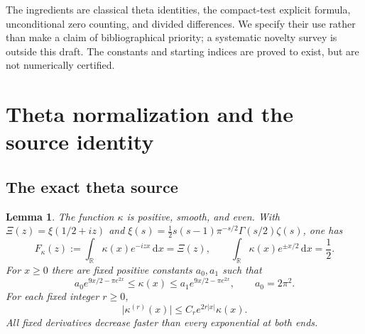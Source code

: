 \documentclass[11pt,a4paper]{article}
\newcommand{\R}{\mathbb R}
\newcommand{\abs}[1]{\lvert #1\rvert}
\newcommand{\dd}{\,\mathrm d}
\newtheorem{lemma}[theorem]{Lemma}
\theoremstyle{definition}
\theoremstyle{remark}
\numberwithin{equation}{section}
\begin{document}
The ingredients are classical theta identities, the compact-test explicit
formula, unconditional zero counting, and divided differences. We specify
their use rather than make a claim of bibliographical priority; a systematic
novelty survey is outside this draft. The constants and starting indices
are proved to exist, but are not numerically certified.

\section{Theta normalization and the source identity}\label{sec:source}

\subsection{The exact theta source}
\begin{lemma}\label{lem:theta}
The function $\kappa$ is positive, smooth, and even. With
$\Xi(z)=\xi(1/2+iz)$ and
$\xi(s)=\tfrac12s(s-1)\pi^{-s/2}\Gamma(s/2)\zeta(s)$, one has
\begin{equation}\label{eq:theta-transform}
 F_\kappa(z):=\int_\R\kappa(x)e^{-izx}\dd x=\Xi(z),
 \qquad
 \int_\R\kappa(x)e^{\pm x/2}\dd x=\frac12.
\end{equation}
For $x\ge0$ there are fixed positive constants $a_0,a_1$ such that
\begin{equation}\label{eq:theta-profile}
 a_0e^{9x/2-\pi e^{2x}}\le\kappa(x)
       \le a_1e^{9x/2-\pi e^{2x}},\qquad a_0=2\pi^2.
\end{equation}
For each fixed integer $r\ge0$,
\begin{equation}\label{eq:theta-derivative}
 \abs{\kappa^{(r)}(x)}\le C_r e^{2r\abs{x}}\kappa(x).
\end{equation}
All fixed derivatives decrease faster than every exponential at both ends.
\end{lemma}
\end{document}
